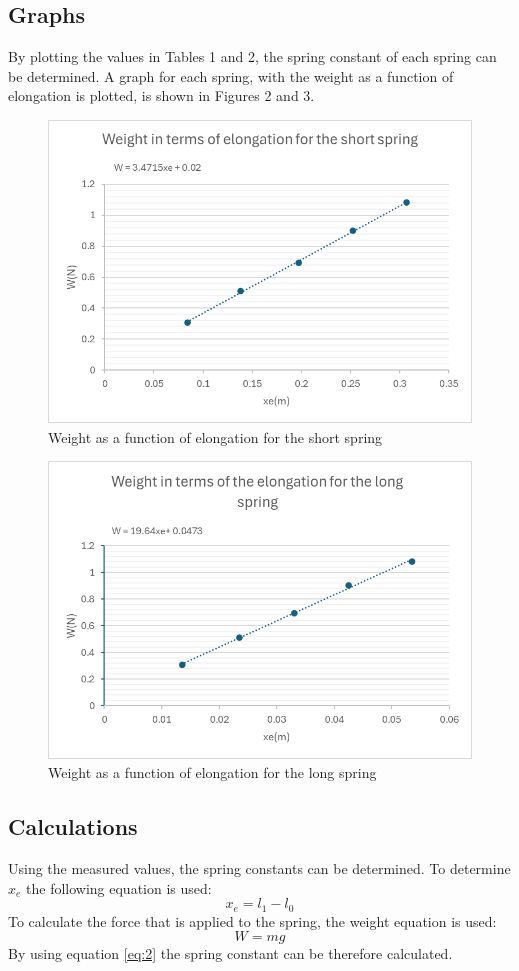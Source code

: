 \documentclass[a4paper, 10pt]{article}
\begin{document}
\begin{justify}
\subsection{Graphs}
By plotting the values in Tables 1 and 2, the spring constant of each spring can
be determined. A graph for each spring, with the weight as a function of elongation is plotted,
is shown in Figures 2 and 3.
\begin{figure}[!h]
    \centering
    \includegraphics[width = 0.7\linewidth]{constant_short_spring.png}
    \caption{Weight as a function of elongation for the short spring}
    \label{fig:2}
\end{figure}
\begin{figure}[!h]
    \centering
    \includegraphics[width = 0.7\linewidth]{constant_long_spring.png}
    \caption{Weight as a function of elongation for the long spring}
    \label{fig:3}
\end{figure}
\subsection{Calculations}
Using the measured values, the spring constants can be determined. To determine
$x_e$ the following equation is used:
\begin{equation}
    x_e = l_1 - l_0
\end{equation}
To calculate the force that is applied to the spring, the weight equation is
used:
\begin{equation}
    W = mg
\end{equation}
By using equation \ref{eq:2} the spring constant can be therefore calculated.

\end{justify}
\end{document}
